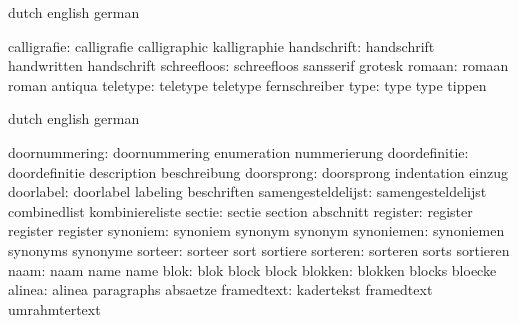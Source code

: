\stopconstants

\startvariables       dutch                english             german

        calligrafie:  calligrafie          calligraphic        kalligraphie
        handschrift:  handschrift          handwritten         handschrift
        schreefloos:  schreefloos          sansserif           grotesk
             romaan:  romaan               roman               antiqua
           teletype:  teletype             teletype            fernschreiber
               type:  type                 type                tippen

\stopvariables




\startsetupvariables  dutch                english             german

      doornummering:  doornummering        enumeration         nummerierung
      doordefinitie:  doordefinitie        description         beschreibung
         doorsprong:  doorsprong           indentation         einzug
          doorlabel:  doorlabel            labeling            beschriften
 samengesteldelijst:  samengesteldelijst   combinedlist        kombiniereliste
             sectie:  sectie               section             abschnitt
           register:  register             register            register
           synoniem:  synoniem             synonym             synonym
         synoniemen:  synoniemen           synonyms            synonyme
            sorteer:  sorteer              sort                sortiere
           sorteren:  sorteren             sorts               sortieren
               naam:  naam                 name                name
               blok:  blok                 block               block
            blokken:  blokken              blocks              bloecke
             alinea:  alinea               paragraphs          absaetze
         framedtext:  kadertekst           framedtext          umrahmtertext

\stopsetupvariables



